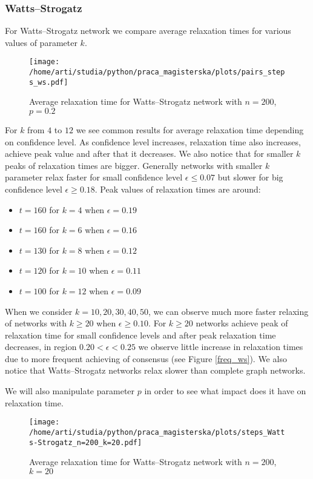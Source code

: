 \documentclass{article}
\begin{document}
\subsubsection{Watts--Strogatz}
For Watts--Strogatz network we compare average relaxation times for various values of parameter $k$.

\begin{figure}[H]
		\centering
		\texttt{[image: /home/arti/studia/python/praca\_magisterska/plots/pairs\_steps\_ws.pdf]}
		\caption{Average relaxation time for Watts--Strogatz network with $n=200$, $p=0.2$}
\end{figure}

For $k$ from $4$ to $12$ we see common results for average relaxation time depending on confidence level. As confidence level increases, relaxation time also increases, achieve peak value and after that it decreases. We also notice that for smaller $k$ peaks of relaxation times are bigger. Generally networks with smaller $k$ parameter relax faster for small confidence level $\epsilon \leq 0.07$ but slower for big confidence level $\epsilon \geq 0.18$. Peak values of relaxation times are around:
\begin{itemize}
\item $t=160$ for $k=4$ when $\epsilon=0.19$
\item $t=160$ for $k=6$ when $\epsilon=0.16$
\item $t=130$ for $k=8$ when $\epsilon=0.12$
\item $t=120$ for $k=10$ when $\epsilon=0.11$
\item $t=100$ for $k=12$ when $\epsilon=0.09$
\end{itemize} 

When we consider $k=10, 20, 30, 40, 50$, we can observe much more faster relaxing of networks with $k \geq 20$ when $\epsilon \geq 0.10$. For $k \geq 20$ networks achieve peak of relaxation time for small confidence levels and after peak relaxation time decreases, in region $0.20 < \epsilon < 0.25$ we observe little increase in relaxation times due to more frequent achieving of consensus (see Figure \ref{freq_ws}). We also notice that Watts--Strogatz networks relax slower than complete graph networks.

\indent

We will also manipulate parameter $p$ in order to see what impact does it have on relaxation time.

\begin{figure}[H]
		\centering
		\texttt{[image: /home/arti/studia/python/praca\_magisterska/plots/steps\_Watts-Strogatz\_n=200\_k=20.pdf]}
		\caption{Average relaxation time for Watts--Strogatz network with $n=200$, $k=20$}
\end{figure}
\end{document}
